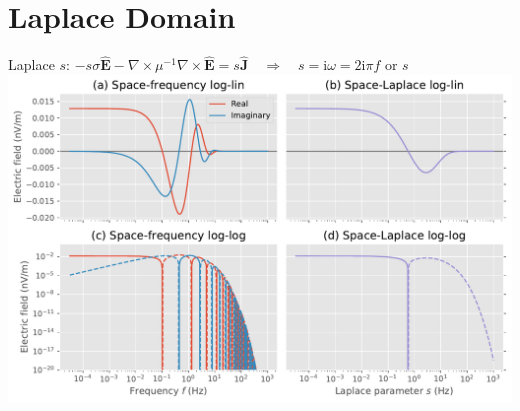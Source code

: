 \documentclass[xcolor=svgnames, aspectratio=169]{beamer}
\begin{document}
  \section{Laplace Domain} %

  \begin{frame}%
    {Laplace $s$: $ -s \sigma \mathbf{\hat{E}} - \nabla \times \mu^{-1} \nabla
        \times \mathbf{\hat{E}} = s\mathbf{\hat{J}}
        \quad \Rightarrow \quad s =
        \mathrm{i}\omega = 2\mathrm{i}\pi f
        \text{ or } s
      $}
      \includegraphics[width=.85\textwidth]{motivationcomparison}
  \end{frame}
\end{document}
